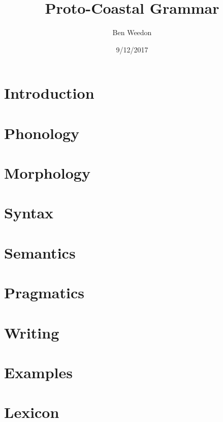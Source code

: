 \documentclass{article}
\title{Proto-Coastal Grammar}
\author{Ben Weedon}
\date{9/12/2017}
\begin{document}
    \maketitle

    \section{Introduction}
    
    \section{Phonology}
    
    \section{Morphology}
    
    \section{Syntax}
    
    \section{Semantics}
    
    \section{Pragmatics}
    
    \section{Writing}
    
    \section{Examples}
    
    \section{Lexicon}
    
\end{document}
